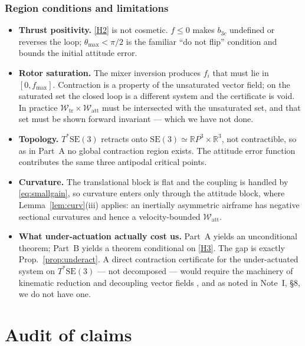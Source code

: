 \documentclass[11pt,a4paper]{article}
\newcommand{\Rm}{\mathbb{R}}
\newcommand{\SE}{\mathrm{SE}(3)}
\theoremstyle{plain}
\theoremstyle{definition}
\theoremstyle{remark}
\begin{document}
\section{Region conditions and limitations}
\label{sec:se3-caveats}

\begin{itemize}[leftmargin=1.6em,itemsep=3pt]
\item \textbf{Thrust positivity.} \ref{H2} is not cosmetic. $f\le0$ makes
      $b_{3c}$ undefined or reverses the loop; $\theta_{\max}<\pi/2$ is the
      familiar ``do not flip'' condition and bounds the initial attitude error.
\item \textbf{Rotor saturation.} The mixer inversion produces $f_i$ that must lie
      in $[0,f_{\max}]$. Contraction is a property of the unsaturated vector
      field; on the saturated set the closed loop is a different system and the
      certificate is void. In practice $\mathcal{W}_{\mathrm{tr}}\times\mathcal{W}_{\mathrm{att}}$
      must be intersected with the unsaturated set, and that set must be shown
      forward invariant --- which we have not done.
\item \textbf{Topology.} $T^{*}\SE$ retracts onto $\SE\simeq\Rm P^3\times\Rm^3$,
      not contractible, so as in Part~A no global contraction region exists. The
      attitude error function contributes the same three antipodal critical points.
\item \textbf{Curvature.} The translational block is flat and the coupling is
      handled by \eqref{eq:smallgain}, so curvature enters only through the
      attitude block, where Lemma~\ref{lem:curv}(iii) applies: an inertially
      asymmetric airframe has negative sectional curvatures and hence a
      velocity-bounded $\mathcal{W}_{\mathrm{att}}$.
\item \textbf{What under-actuation actually cost us.} Part~A yields an
      unconditional theorem; Part~B yields a theorem conditional on \ref{H3}. The
      gap is exactly Prop.~\ref{prop:underact}. A direct contraction certificate
      for the under-actuated system on $T^{*}\SE$ --- not decomposed --- would
      require the machinery of kinematic reduction and decoupling vector fields
      \cite[Ch.~8]{BL04}, and as noted in Note~I, \S8, we do not have one.
\end{itemize}

\part*{Audit of claims}
\setcounter{section}{0}
\renewcommand{\thesection}{C}
\end{document}
